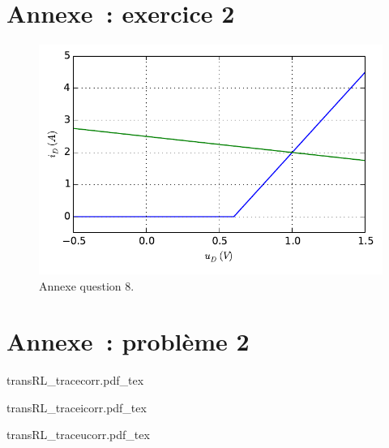 \documentclass[a4paper, 10pt, garamond, oneside]{book}
\begin{document}
{	\chapter*{Annexe~: exercice 2}
  \vfill
  \begin{figure}[htbp]
    \centering
    \includegraphics[width=\linewidth]{diode_annexecorr}
		\caption{Annexe question 8.}
    \label{fig:diode_annexecorr}
  \end{figure}
  \vfill

	\chapter{Annexe~: problème 2}
	\begin{center}
		{transRL_tracecorr.pdf_tex}
		\label{fig:annexe_p2-1_corr}
	\end{center}
	\begin{center}
		{transRL_traceicorr.pdf_tex}
		\label{fig:annexe_p2-2_corr}
	\end{center}
	\begin{center}
		{transRL_traceucorr.pdf_tex}
		\label{fig:annexe_p2-3_corr}
	\end{center}
}
\vspace{-20pt}
\end{document}

